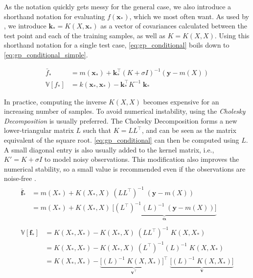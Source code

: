As the notation quickly gets messy for the general case, we also introduce a shorthand notation for evaluating $f(\boldsymbol{x}_*)$, which we most often want. As used by \cite{rasmussen}, we introduce $\boldsymbol{k}_* = K(X, \boldsymbol{x}_*)$ as a vector of covariances calculated between the test point and each of the training samples, as well as $K=K(X, X)$. Using this shorthand notation for a single test case, \cref{eq:gp_conditional} boils down to \cref{eq:gp_conditional_simple}.

\begin{subequations}\label{eq:gp_conditional_simple}
\begin{align}
    \bar{f}_* &= m(\boldsymbol{x}_*) + \boldsymbol{k}_*^\intercal ( K + \sigma I)^{-1} (\boldsymbol{y} - m(X))\\
    \mathbb{V}[f_*] &= k(\boldsymbol{x}_*, \boldsymbol{x}_*) - \boldsymbol{k}_*^\intercal K^{-1} \; \boldsymbol{k}_*\label{eq:gp_conditional_var_simple}
\end{align}
\end{subequations}

In practice, computing the inverse $K(X, X)$ becomes expensive for an increasing number of samples. To avoid numerical instability, using the \textit{Cholesky Decomposition} is usually preferred. The Cholesky Decomposition forms a new lower-triangular matrix $L$ such that $K = L L^\intercal$, and can be seen as the matrix equivalent of the square root. \cref{eq:gp_conditional} can then be computed using $L$. A small diagonal entry is also usually added to the kernel matrix, i.e., $K' = K + \sigma I$ to model noisy observations. This modification also improves the numerical stability, so a small value is recommended even if the observations are noise-free \cite{scikit-learn}.
\begin{subequations}
\begin{align}
    \begin{split}
    \bar{\boldsymbol{f}}_* &= m(X_*) + K(X_*, X) \; (L L^\intercal)^{-1} \; (\boldsymbol{y} - m(X))\\ &= m(X_*) + K(X_*, X) \; \underbrace{\big[(L^\intercal)^{-1} (L)^{-1}  \; (\boldsymbol{y} - m(X))\big]}_{\boldsymbol{\alpha}}
    \end{split}\\
    \begin{split}
    \mathbb{V}[\boldsymbol{f}_*] &= K(X_*, X_*) - K(X_*, X) \; (L L^\intercal)^{-1} \; K(X, X_*)\\
    &= K(X_*, X_*) - K(X_*, X) \; (L^\intercal)^{-1} (L)^{-1} \; K(X, X_*)\\
    &= K(X_*, X_*) - \underbrace{\big[(L)^{-1} \; K(X, X_*)\big]^\intercal}_{\boldsymbol{v^\intercal}} \; \underbrace{\big[(L)^{-1} \; K(X, X_*)\big]}_{\boldsymbol{v}}
    \end{split}
\end{align}
\end{subequations}

